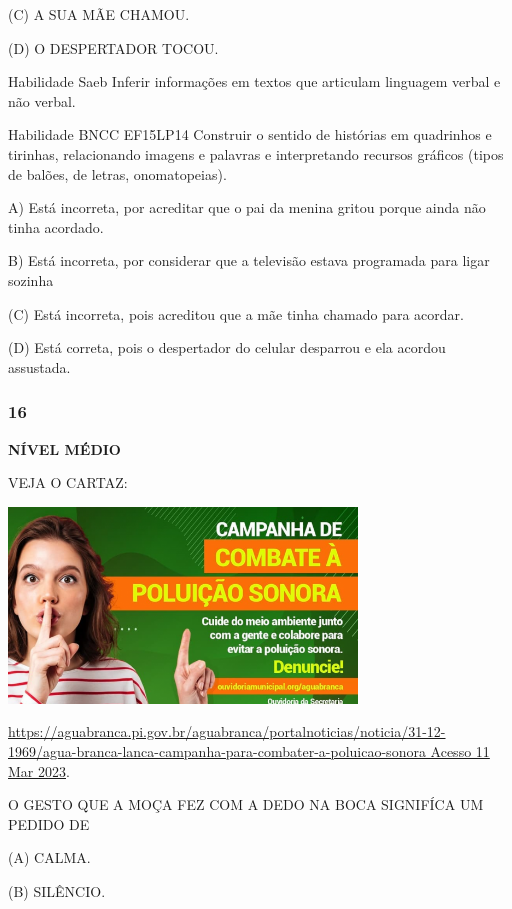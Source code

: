 (C) A SUA MÃE CHAMOU.

(D) O DESPERTADOR TOCOU.

\protect\hypertarget{_Hlk129586447}{}{}Habilidade Saeb Inferir
informações em textos que articulam linguagem verbal e não verbal.

Habilidade BNCC EF15LP14 Construir o sentido de histórias em quadrinhos
e tirinhas, relacionando imagens e palavras e interpretando recursos
gráficos (tipos de balões, de letras, onomatopeias).

A) Está incorreta, por acreditar que o pai da menina gritou porque ainda
não tinha acordado.

B) Está incorreta, por considerar que a televisão estava programada para
ligar sozinha

(C) Está incorreta, pois acreditou que a mãe tinha chamado para acordar.

(D) Está correta, pois o despertador do celular desparrou e ela acordou
assustada.

\subsubsection{16}\label{section-142}

\textbf{NÍVEL MÉDIO}

VEJA O CARTAZ:

\includegraphics[width=3.64744in,height=2.05233in]{media/image173.png}

\href{https://aguabranca.pi.gov.br/aguabranca/portalnoticias/noticia/31-12-1969/agua-branca-lanca-campanha-para-combater-a-poluicao-sonora\%20Acesso\%2011\%20Mar\%202023}{https://aguabranca.pi.gov.br/aguabranca/portalnoticias/noticia/31-12-1969/agua-branca-lanca-campanha-para-combater-a-poluicao-sonora
Acesso 11 Mar 2023}.

O GESTO QUE A MOÇA FEZ COM A DEDO NA BOCA SIGNIFÍCA UM PEDIDO DE

(A) CALMA.

(B) SILÊNCIO.

